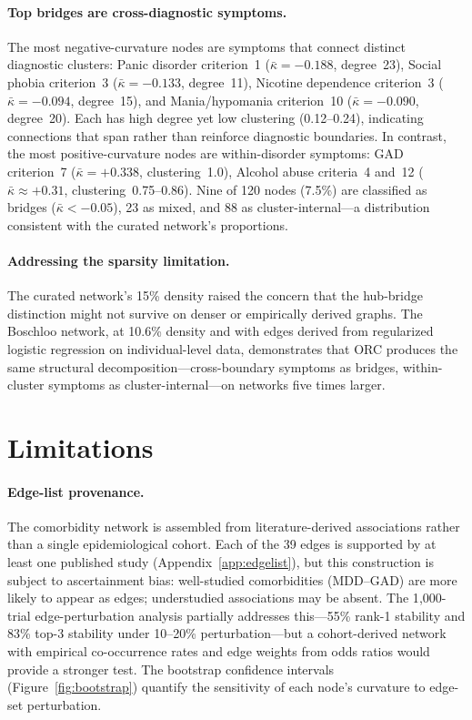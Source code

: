 \documentclass{article}
\begin{document}
\paragraph{Top bridges are cross-diagnostic symptoms.} The most negative-curvature nodes are symptoms that connect distinct diagnostic clusters: Panic disorder criterion~1 ($\bar\kappa = -0.188$, degree~23), Social phobia criterion~3 ($\bar\kappa = -0.133$, degree~11), Nicotine dependence criterion~3 ($\bar\kappa = -0.094$, degree~15), and Mania/hypomania criterion~10 ($\bar\kappa = -0.090$, degree~20). Each has high degree yet low clustering (0.12--0.24), indicating connections that span rather than reinforce diagnostic boundaries. In contrast, the most positive-curvature nodes are within-disorder symptoms: GAD criterion~7 ($\bar\kappa = +0.338$, clustering~1.0), Alcohol abuse criteria~4 and~12 ($\bar\kappa \approx +0.31$, clustering~0.75--0.86). Nine of 120 nodes (7.5\%) are classified as bridges ($\bar\kappa < -0.05$), 23 as mixed, and 88 as cluster-internal---a distribution consistent with the curated network's proportions.

\paragraph{Addressing the sparsity limitation.} The curated network's 15\% density raised the concern that the hub-bridge distinction might not survive on denser or empirically derived graphs. The Boschloo network, at 10.6\% density and with edges derived from regularized logistic regression on individual-level data, demonstrates that ORC produces the same structural decomposition---cross-boundary symptoms as bridges, within-cluster symptoms as cluster-internal---on networks five times larger.

\section{Limitations}

\paragraph{Edge-list provenance.} The comorbidity network is assembled from literature-derived associations rather than a single epidemiological cohort. Each of the 39 edges is supported by at least one published study (Appendix~\ref{app:edgelist}), but this construction is subject to ascertainment bias: well-studied comorbidities (MDD--GAD) are more likely to appear as edges; understudied associations may be absent. The 1{,}000-trial edge-perturbation analysis partially addresses this---55\% rank-1 stability and 83\% top-3 stability under 10--20\% perturbation---but a cohort-derived network with empirical co-occurrence rates and edge weights from odds ratios would provide a stronger test. The bootstrap confidence intervals (Figure~\ref{fig:bootstrap}) quantify the sensitivity of each node's curvature to edge-set perturbation.
\end{document}
